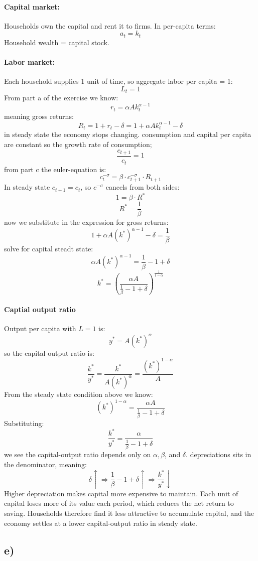 \documentclass[12pt]{article}
\begin{document}
\paragraph{Capital market:} Households own the capital and rent it to firms. In per-capita terms:
$$
a_t=k_t
$$
Household wealth = capital stock.
\paragraph{Labor market:} Each household supplies 1 unit of time, so aggregate labor per capita = 1:
$$
L_t=1
$$
From part a of the exercise we know:
$$
r_t=\alpha A k_t^{\alpha-1}
$$
meaning gross returns:
$$
R_t=1+r_t-\delta=1+\alpha A k_t^{\alpha-1}-\delta
$$
in steady state the economy stops changing. consumption and capital per capita are constant so the growth rate of consumption;
$$
\frac{c_{t+1}}{c_t}=1
$$
from part c the euler-equation is:
$$
c_t^{-\sigma}=\beta \cdot c_{t+1}^{-\sigma} \cdot R_{t+1}
$$
In steady state $c_{t+1}=c_t$, so $c^{-\sigma}$ cancels from both sides:
$$
1=\beta \cdot R^*
$$
$$
R^*=\frac{1}{\beta}
$$
now we substitute in the expression for gross returns:
$$1+\alpha A\left(k^*\right)^{\alpha-1}-\delta=\frac{1}{\beta}$$
solve for capital steadt state:
$$
\alpha A\left(k^*\right)^{\alpha-1}=\frac{1}{\beta}-1+\delta
$$
$$
\boxed{k^*=\left(\frac{\alpha A}{\frac{1}{\beta}-1+\delta}\right)^{\frac{1}{1-\alpha}}}
$$
\paragraph{Captial output ratio}
Output per capita with $L=1$ is:
$$
y^*=A\left(k^*\right)^\alpha
$$
so the capital output ratio is:
$$
\frac{k^*}{y^*}=\frac{k^*}{A\left(k^*\right)^\alpha}=\frac{\left(k^*\right)^{1-\alpha}}{A}
$$
From the steady state condition above we know:
$$
\left(k^*\right)^{1-\alpha}=\frac{\alpha A}{\frac{1}{\beta}-1+\delta}
$$
Substituting:
$$
\boxed{\frac{k^*}{y^*}=\frac{\alpha}{\frac{1}{\beta}-1+\delta}}
$$
we see the capital-output ratio depends only on $\alpha, \beta$, and $\delta$. depreciations sits in the denominator, meaning:
$$
\delta \uparrow \Rightarrow \frac{1}{\beta}-1+\delta \uparrow \Rightarrow \frac{k^*}{y^*} \downarrow
$$
Higher depreciation makes capital more expensive to maintain. Each unit of capital loses more of its value each period, which reduces the net return to saving. Households therefore find it less attractive to accumulate capital, and the economy settles at a lower capital-output ratio in steady state.

\subsection{e)}
\end{document}
